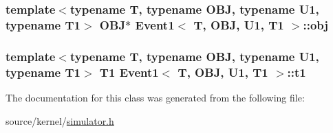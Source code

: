 \hypertarget{classEvent1_dc793df07c00b32a012cf45b31b9d2e6}{
\subsubsection[{obj}]{\setlength{\rightskip}{0pt plus 5cm}template$<$typename T, typename OBJ, typename U1, typename T1$>$ OBJ$\ast$ {\bf Event1}$<$ T, OBJ, U1, T1 $>$::{\bf obj}}}
\label{classEvent1_dc793df07c00b32a012cf45b31b9d2e6}


\hypertarget{classEvent1_1af2759e05940a423f3b9409feab75f9}{
\subsubsection[{t1}]{\setlength{\rightskip}{0pt plus 5cm}template$<$typename T, typename OBJ, typename U1, typename T1$>$ T1 {\bf Event1}$<$ T, OBJ, U1, T1 $>$::{\bf t1}}}
\label{classEvent1_1af2759e05940a423f3b9409feab75f9}




The documentation for this class was generated from the following file:\begin{CompactItemize}
\item 
source/kernel/\hyperlink{simulator_8h}{simulator.h}\end{CompactItemize}
